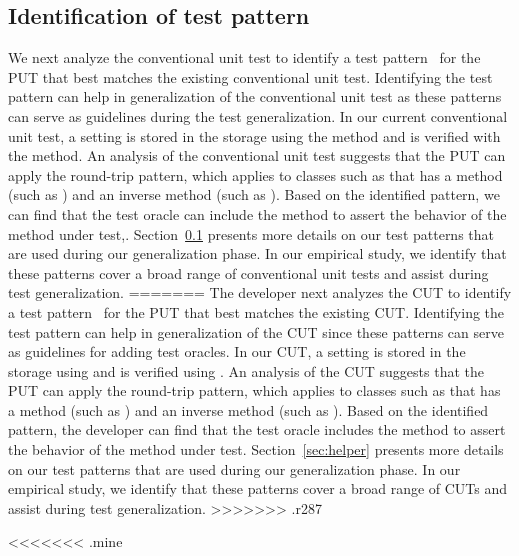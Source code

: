 \subsection{Identification of test pattern} We next analyze the conventional unit test to identify a test pattern~\cite{PEXDOC} for the PUT that best matches the existing conventional unit test. Identifying the test pattern can help in generalization of the conventional unit test as these patterns can serve as guidelines during the test generalization. In our current conventional unit test, a setting is stored in the storage using the  method and is verified with the  method. An analysis of the conventional unit test suggests that the PUT can apply the round-trip pattern, which applies to classes such as  that has a method (such as ) and an inverse method (such as ). Based on the identified pattern, we can find that the test oracle can include the  method to assert the behavior of the method under test,. Section~\ref{} presents more details on our test patterns that are used during our generalization phase. In our empirical study, we identify that these patterns cover a broad range of conventional unit tests and assist during test generalization.
=======
The developer next analyzes the CUT to identify a test pattern~\cite{PEXDOC} for the PUT that best matches the existing CUT. Identifying the test pattern can help in generalization of the CUT since these patterns can serve as guidelines for adding test oracles. In our CUT, a setting is stored in the storage using  and is verified using . An analysis of the CUT suggests that the PUT can apply the round-trip pattern, which applies to classes such as  that has a method (such as ) and an inverse method (such as ). Based on the identified pattern, the developer can find that the test oracle  includes the  method to assert the behavior of the  method under test. Section~\ref{sec:helper} presents more details on our test patterns that are used during our generalization phase. In our empirical study, we identify that these patterns cover a broad range of CUTs and assist during test generalization.
>>>>>>> .r287

<<<<<<< .mine
